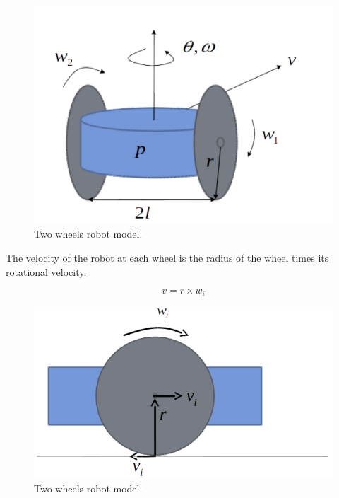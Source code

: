 \begin{figure}[!htb]
\begin{center}
\includegraphics[scale=0.290]{img/kinematics/two_wheels_robot.jpeg}
\end{center}
\caption{Two wheels robot model.}
\label{two_wheels_robot}
\end{figure}


The velocity of the robot at each wheel is the radius of the wheel times its rotational velocity. 

\begin{equation}
 v =r \times w_i
\end{equation}

\begin{figure}[!htb]
\begin{center}
\includegraphics[scale=0.290]{img/kinematics/two_wheels_robot_kinematic_constraint.jpeg}
\end{center}
\caption{Two wheels robot model.}
\label{two_wheels_robot_kinematic_constraint}
\end{figure}

